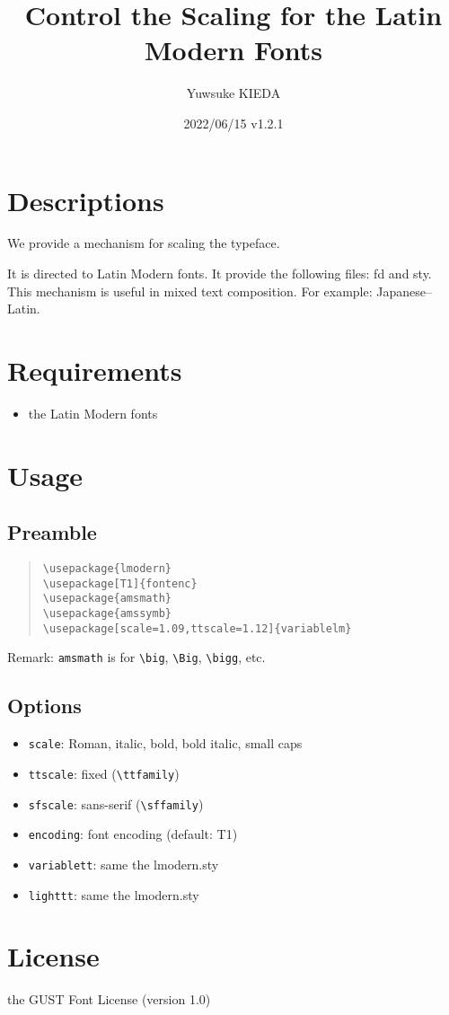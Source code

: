 \documentclass{article}
\title{Control the Scaling for the Latin Modern Fonts}
\author{Yuwsuke KIEDA}
\date{2022/06/15 v1.2.1}
\begin{document}
\maketitle

\section{Descriptions}

We provide a mechanism for scaling the typeface.

It is directed to Latin Modern fonts.
It provide the following files: fd and sty.
This mechanism is useful in mixed text composition.
For example: Japanese--Latin.

\section{Requirements}

\begin{itemize}
 \item the Latin Modern fonts
\end{itemize}

\section{Usage}

\subsection{Preamble}

\begin{quote}
\begin{verbatim}
\usepackage{lmodern}
\usepackage[T1]{fontenc}
\usepackage{amsmath}
\usepackage{amssymb}
\usepackage[scale=1.09,ttscale=1.12]{variablelm}
\end{verbatim}
\end{quote}

Remark: \texttt{amsmath} is for \verb!\big!, \verb!\Big!, \verb!\bigg!, etc.

\subsection{Options}

\begin{itemize}
 \item [\textendash] \texttt{scale}: Roman, italic, bold, bold italic, small caps
 \item [\textendash] \texttt{ttscale}: fixed (\verb!\ttfamily!)
 \item [\textendash] \texttt{sfscale}: sans-serif (\verb!\sffamily!)
 \item [\textendash] \texttt{encoding}: font encoding (default: T1)
 \item [\textendash] \texttt{variablett}: same the lmodern.sty
 \item [\textendash] \texttt{lighttt}: same the lmodern.sty
\end{itemize}


\section{License}

the GUST Font License (version 1.0)
\end{document}
